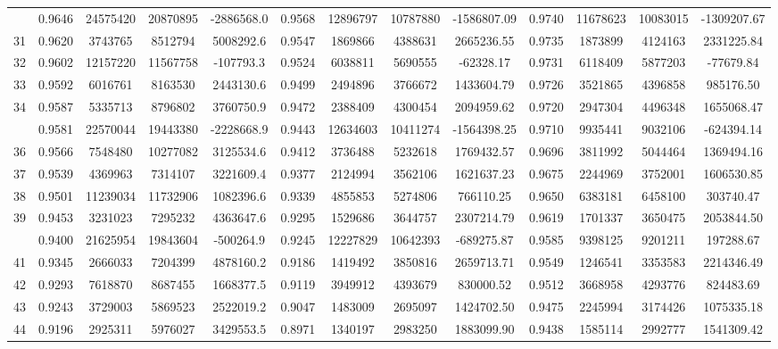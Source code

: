 \documentclass[
  12pt,
]{article}
\begin{document}
\begin{longtable}[t]{lcccccccccccc}
\addlinespace
30 & 0.9646 & 24575420 & 20870895 & -2886568.0 & 0.9568 & 12896797 & 10787880 & -1586807.09 & 0.9740 & 11678623 & 10083015 & -1309207.67\\
31 & 0.9620 & 3743765 & 8512794 & 5008292.6 & 0.9547 & 1869866 & 4388631 & 2665236.55 & 0.9735 & 1873899 & 4124163 & 2331225.84\\
32 & 0.9602 & 12157220 & 11567758 & -107793.3 & 0.9524 & 6038811 & 5690555 & -62328.17 & 0.9731 & 6118409 & 5877203 & -77679.84\\
33 & 0.9592 & 6016761 & 8163530 & 2443130.6 & 0.9499 & 2494896 & 3766672 & 1433604.79 & 0.9726 & 3521865 & 4396858 & 985176.50\\
34 & 0.9587 & 5335713 & 8796802 & 3760750.9 & 0.9472 & 2388409 & 4300454 & 2094959.62 & 0.9720 & 2947304 & 4496348 & 1655068.47\\
\addlinespace
35 & 0.9581 & 22570044 & 19443380 & -2228668.9 & 0.9443 & 12634603 & 10411274 & -1564398.25 & 0.9710 & 9935441 & 9032106 & -624394.14\\
36 & 0.9566 & 7548480 & 10277082 & 3125534.6 & 0.9412 & 3736488 & 5232618 & 1769432.57 & 0.9696 & 3811992 & 5044464 & 1369494.16\\
37 & 0.9539 & 4369963 & 7314107 & 3221609.4 & 0.9377 & 2124994 & 3562106 & 1621637.23 & 0.9675 & 2244969 & 3752001 & 1606530.85\\
38 & 0.9501 & 11239034 & 11732906 & 1082396.6 & 0.9339 & 4855853 & 5274806 & 766110.25 & 0.9650 & 6383181 & 6458100 & 303740.47\\
39 & 0.9453 & 3231023 & 7295232 & 4363647.6 & 0.9295 & 1529686 & 3644757 & 2307214.79 & 0.9619 & 1701337 & 3650475 & 2053844.50\\
\addlinespace
40 & 0.9400 & 21625954 & 19843604 & -500264.9 & 0.9245 & 12227829 & 10642393 & -689275.87 & 0.9585 & 9398125 & 9201211 & 197288.67\\
41 & 0.9345 & 2666033 & 7204399 & 4878160.2 & 0.9186 & 1419492 & 3850816 & 2659713.71 & 0.9549 & 1246541 & 3353583 & 2214346.49\\
42 & 0.9293 & 7618870 & 8687455 & 1668377.5 & 0.9119 & 3949912 & 4393679 & 830000.52 & 0.9512 & 3668958 & 4293776 & 824483.69\\
43 & 0.9243 & 3729003 & 5869523 & 2522019.2 & 0.9047 & 1483009 & 2695097 & 1424702.50 & 0.9475 & 2245994 & 3174426 & 1075335.18\\
44 & 0.9196 & 2925311 & 5976027 & 3429553.5 & 0.8971 & 1340197 & 2983250 & 1883099.90 & 0.9438 & 1585114 & 2992777 & 1541309.42\\

\end{longtable}
\end{document}
